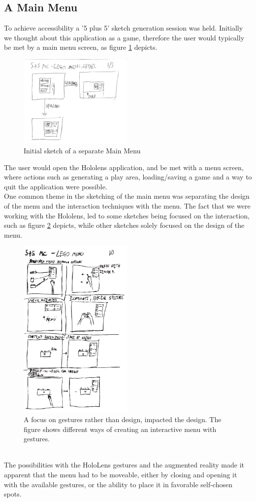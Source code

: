 \subsection{A Main Menu}
To achieve accessibility a '5 plus 5' sketch generation session was held. Initially we thought about this application as a game, therefore the user would typically be met by a main menu screen, as figure \ref{fig:menu8} depicts.
\begin{figure}[t]
	\centering
	\includegraphics[width=210px]{figures/Menu/menu8_1.pdf}
	\caption{Initial sketch of a separate Main Menu}
	\label{fig:menu8}
\end{figure}
The user would open the Hololens application, and be met with a menu screen, where actions such as generating a play area, loading/saving a game and a way to quit the application were possible. \\
One common theme in the sketching of the main menu was separating the design of the menu and the interaction techniques with the menu. The fact that we were working with the Hololens, led to some sketches being focused on the interaction, such as figure \ref{fig:menugesture} depicts,  while other sketches solely focused on the design of the menu.\\
\begin{figure}[t]
	\centering
	\includegraphics[width=210px]{figures/Menu/menu5_1.pdf}
	\caption{A focus on gestures rather than design, impacted the design. The figure shows different ways of creating an interactive menu with gestures.}
	\label{fig:menugesture}
\end{figure}
\\
The possibilities with the HoloLens gestures and the augmented reality made it apparent that the menu had to be moveable, either by closing and opening it with the available gestures, or the ability to place it in favorable self-chosen spots.
